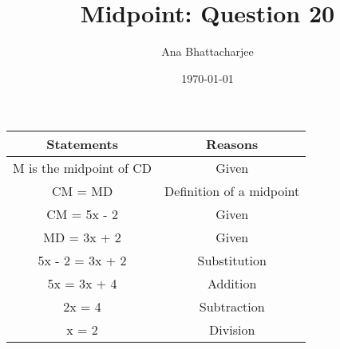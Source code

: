 \documentclass{article}
\begin{document}
\author{Ana Bhattacharjee}
\title{Midpoint: Question 20}
\date{\today}
\maketitle{}


\begin{center}
\begin{tabular}{|c|c|}
\hline
\textbf{Statements} & \textbf{Reasons} \\
\hline
M is the midpoint of CD & Given \\
\hline
CM = MD & Definition of a midpoint \\
\hline
CM = 5x - 2 & Given \\
\hline
MD = 3x + 2 & Given \\
\hline
5x - 2 = 3x + 2 & Substitution \\
\hline
5x = 3x + 4 & Addition \\
\hline
2x = 4 & Subtraction \\
\hline
x = 2 & Division \\ 
\hline
\end{tabular}
\end{center}
\end{document}

